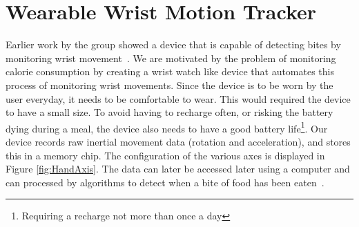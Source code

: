 \section{Wearable Wrist Motion Tracker}
\label{Sec:WearbleTracker}
Earlier work by the group showed a device that is capable of detecting bites by monitoring wrist movement~\cite{drennan2010assessment}.
We are motivated by the problem of monitoring calorie consumption by creating a wrist watch like device that automates this process of monitoring wrist movements.
Since the device is to be worn by the user everyday, it needs to be comfortable to wear.
This would required the device to have a small size.
To avoid having to recharge often, or risking the battery dying during a meal,
the device also needs to have a good battery life\footnote{Requiring a recharge not more than once a day}.
Our device records raw inertial movement data (rotation and acceleration), and stores this in a memory chip.
The configuration of the various axes is displayed in Figure \ref{fig:HandAxis}.
The data can later be accessed later using a computer and can processed by algorithms
to detect when a bite of food has been eaten~\cite{dong2012new}.
